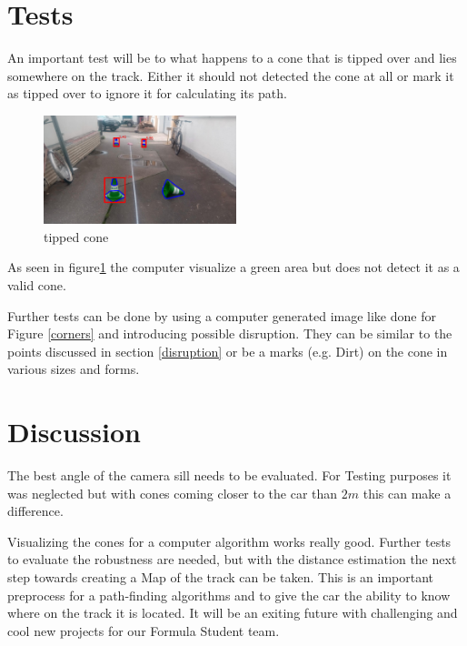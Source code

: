 \documentclass[10pt,a4paper]{article}
\begin{document}
	\section{Tests}
	An important test will be to what happens to a cone that is tipped over and lies somewhere on the track. Either it should not detected the cone at all or mark it as tipped over to ignore it for calculating its path.
	\begin{figure}[h]
		\centering
		\includegraphics[width=0.5\textwidth]{Abb/cone-tipped.png}
		\caption{tipped cone}
		\label{cone-tipped}
	\end{figure}
	As seen in figure\ref{cone-tipped} the computer visualize a green area but does not detect it as a valid cone.
	
	Further tests can be done by using a computer generated image like done for Figure \ref{corners} and introducing possible disruption. They can be similar to the points discussed in section \ref{disruption} or be a marks (e.g. Dirt) on the cone in various sizes and forms.
	
	
	\section{Discussion}
	The best angle of the camera sill needs to be evaluated. For Testing purposes it was neglected but with cones coming closer to the car than $2m$ this can make a difference.
	
	
	Visualizing the cones for a computer algorithm works really good. Further tests to evaluate the robustness are needed, but with the distance estimation the next step towards creating a Map of the track can be taken. This is an important preprocess for a path-finding algorithms and to give the car the ability to know where on the track it is located.
	It will be an exiting future with challenging and cool new projects for our Formula Student team.
	
\end{document}
